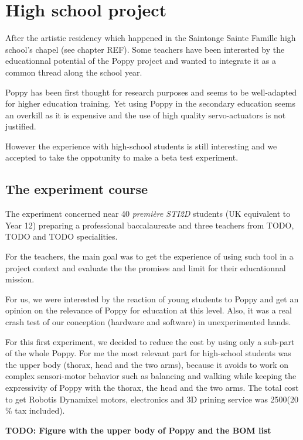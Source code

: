 \section{High school project} %

After the artistic residency which happened in the Saintonge Sainte Famille high school's chapel (see chapter REF). Some teachers have been interested by the educationnal potential of the Poppy project and wanted to integrate it as a common thread along the school year.

Poppy has been first thought for research purposes and seems to be well-adapted for higher education training. Yet using Poppy in the secondary education seems an overkill as it is expensive and the use of high quality servo-actuators is not justified.

However the experience with high-school students is still interesting and we accepted to take the oppotunity to make a beta test experiment.

\subsection{The experiment course} %

The experiment concerned near 40 \emph{première STI2D} students (UK equivalent to Year 12) preparing a professional baccalaureate and three teachers from TODO, TODO and TODO specialities.

For the teachers, the main goal was to get the experience of using such tool in a project context and evaluate the the promises and limit for their educationnal mission.

For us, we were interested by the reaction of young students to Poppy and get an opinion on the relevance of Poppy for education at this level. Also, it was a real crash test of our conception (hardware and software) in unexperimented hands.


For this first experiment, we decided to reduce the cost by using only a sub-part of the whole Poppy. For me the most relevant part for high-school students was the upper body (thorax, head and the two arms), because it avoids to work on complex sensori-motor behavior such as balancing and walking while keeping the expressivity of Poppy with the thorax, the head and the two arms. The total cost to get Robotis Dynamixel motors, electronics and 3D prining service was 2500\texteuro (20 \% tax included).

\textbf{TODO: Figure with the upper body of Poppy and the BOM list}


